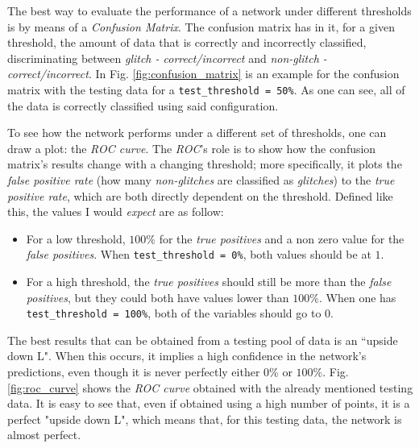 \documentclass[12pt,a4paper,final]{book}			%
\begin{document}
					The best way to evaluate the performance of a network under different thresholds is by means of a \textit{Confusion Matrix}. The confusion matrix has in it, for a given threshold, the amount of data that is correctly and incorrectly classified, discriminating between \textit{glitch - correct/incorrect} and \textit{non-glitch - correct/incorrect}. 
				In Fig. \ref{fig:confusion_matrix} is an example for the confusion matrix with the testing data for a \texttt{test\_threshold = 50\%}. As one can see, all of the data is correctly classified using said configuration.
				
				To see how the network performs under a different set of thresholds, one can draw a plot: the \textit{ROC curve}. The \textit{ROC}'s role is to show how the confusion matrix's results change with a changing threshold; more specifically, it plots the \textit{false positive rate} (how many \textit{non-glitches} are classified as \textit{glitches}) to the \textit{true positive rate}, which are both directly dependent on the threshold.
				Defined like this, the values I would \textit{expect} are as follow:
				\begin{itemize}
					\item For a low threshold, $100\%$ for the \textit{true positives} and a non zero value for the \textit{false positives}. When \texttt{test\_threshold = 0\%}, both values should be at $1$.
					\item For a high threshold, the \textit{true positives} should still be more than the \textit{false positives}, but they could both have values lower than $100\%$. When one has \texttt{test\_threshold = 100\%}, both of the variables should go to $0$.
				\end{itemize}
					The best results that can be obtained from a testing pool of data is an ``upside down L". When this occurs, it implies a high confidence in the network's predictions, even though it is never perfectly either $0\%$ or $100\%$.
				Fig. \ref{fig:roc_curve} shows the \textit{ROC curve} obtained with the already mentioned testing data. It is easy to see that, even if obtained using a high number of points, it is a perfect "upside down L", which means that, for this testing data, the network is almost perfect.
\end{document}
